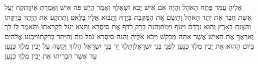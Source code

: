 \documentclass[../main/main.tex]{subfiles}
\begin{document}
\begin{multicols*}{\ncols}
אֵלֶיהָ עֲמֹד פֶּתַח הָאֹהֶל וְהָיָה אִם אִישׁ יָבֹא וּשְׁאֵלֵךְ וְאָמַר הֲיֵשׁ פֹּה אִישׁ וְאָמַרְתְּ אָיִן\PreVerseSpace{}וַתִּקַּח יָעֵל אֵשֶׁת חֶבֶר אֶת יְתַד הָאֹהֶל וַתָּשֶׂם אֶת הַמַּקֶּבֶת בְּיָדָהּ וַתָּבוֹא אֵלָיו בַּלָּאט וַתִּתְקַע אֶת הַיָּתֵד בְּרַקָּתוֹ וַתִּצְנַח בָּאָרֶץ וְהוּא נִרְדָּם וַיָּעַף וַיָּמֹת\PreVerseSpace{}וְהִנֵּה בָרָק רֹדֵף אֶת סִיסְרָא וַתֵּצֵא יָעֵל לִקְרָאתוֹ וַתֹּאמֶר לוֹ לֵךְ וְאַרְאֶךָּ אֶת הָאִישׁ אֲשֶׁר אַתָּה מְבַקֵּשׁ וַיָּבֹא אֵלֶיהָ וְהִנֵּה סִיסְרָא נֹפֵל מֵת וְהַיָּתֵד בְּרַקָּתוֹ\PreVerseSpace{}וַיַּכְנַע אֱלֹהִים בַּיּוֹם הַהוּא אֵת יָבִין מֶלֶךְ כְּנָעַן לִפְנֵי בְּנֵי יִשְׂרָאֵל\PreVerseSpace{}וַתֵּלֶךְ יַד בְּנֵי יִשְׂרָאֵל הָלוֹךְ וְקָשָׁה עַל יָבִין מֶלֶךְ כְּנָעַן עַד אֲשֶׁר הִכְרִיתוּ אֵת יָבִין מֶלֶךְ כְּנָעַן\OpenSection{}\par

\end{multicols*}
\end{document}
